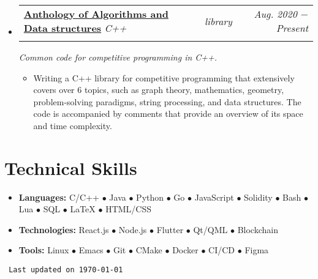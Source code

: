 \documentclass[letterpaper, 11pt]{article}
\makeatletter
\newcommand{\project}[7] {
	\vspace{-1pt}\item[]
  \begin{tabular*}{1\textwidth}[t]{ll@{\extracolsep{\fill}}r}
    #1 \href{#4}{\textbf{\color{RoyalBlue}#2}}
    \textbar{} \textit{\small#5} \textbar{ } & \textit{\footnotesize#7} & \textit{\small #3} \\
    \vspace{-8pt}
  \end{tabular*}
  \textit{\small #6}
  \vspace{-8pt}
}
\newcommand{\subproject}[1] {
\item\small
  {#1}
  \vspace{-2pt}
}
\newcommand{\technicalskill}[3] {
  \vspace{-1pt}
	\item[]\small
  #1 \textbf{#2: }{\footnotesize{#3}}
  \vspace{-2pt}
}
\newcommand{\bulletitem}[1] {{\tiny$\bullet$} #1}
\makeatother
\begin{document}
\begin{itemize}[leftmargin=0pt]

  \project
  {\faIcon{laptop-code}}
  {Anthology of Algorithms and Data structures}{Aug. 2020 $-$ Present}
  {https://github.com/AbdeltwabMF/anthology-of-algorithms-and-data-structures}{C++}
  {Common code for competitive programming in C++.}{library}

  \begin{itemize}
    \subproject
    {Writing a C++ library for competitive programming that extensively covers over 6 topics, such as graph theory, mathematics, geometry, problem-solving paradigms, string processing, and data structures. The code is accompanied by comments that provide an overview of its space and time complexity.}
  \end{itemize}\vspace{-4pt}
\end{itemize}

\section{Technical Skills}
\begin{itemize}[leftmargin=0pt]
  \technicalskill
  {}{Languages}
	{C/C++ \bulletitem{Java} \bulletitem{Python} \bulletitem{Go} \bulletitem{JavaScript} \bulletitem{Solidity} \bulletitem{Bash} \bulletitem{Lua} \bulletitem{SQL} \bulletitem{\LaTeX{}} \bulletitem{HTML/CSS}}

  \technicalskill
  {}{Technologies}
	{React.js \bulletitem{Node.js} \bulletitem{Flutter} \bulletitem{Qt/QML} \bulletitem{Blockchain}}

  \technicalskill
  {}{Tools}
  {Linux \bulletitem{Emacs} \bulletitem{Git} \bulletitem{CMake} \bulletitem{Docker} \bulletitem{CI/CD} \bulletitem{Figma}}
\end{itemize}

\vspace{-25pt}
\begin{flushright}
	\texttt{\tiny 
		\color{Green}
		Last updated on \today
	}
\end{flushright}
\end{document}
